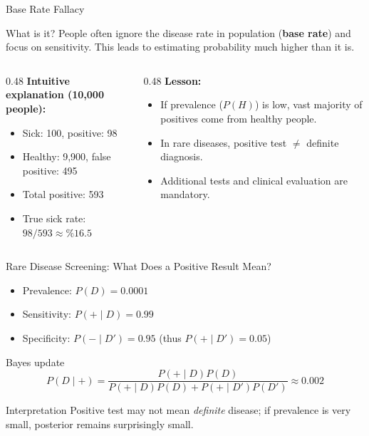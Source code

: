 \documentclass[light]{lutbeamer}
\begin{document}
\begin{frame}{Base Rate Fallacy}
    \begin{block}{What is it?}
        People often ignore the disease rate in population (\textbf{base rate}) and focus on sensitivity. This leads to estimating probability much higher than it is.
    \end{block}

    \begin{columns}[T]
        \begin{column}{0.48\textwidth}
            \textbf{Intuitive explanation (10,000 people):}
            \begin{itemize}
                \item Sick: 100, positive: 98
                \item Healthy: 9,900, false positive: 495
                \item Total positive: 593
                \item True sick rate: $98/593 \approx \%16.5$
            \end{itemize}
        \end{column}
        \begin{column}{0.48\textwidth}
            \textbf{Lesson:}
            \begin{itemize}
                \item If prevalence ($P(H)$) is low, vast majority of positives come from healthy people.
                \item In rare diseases, positive test $\neq$ definite diagnosis.
                \item Additional tests and clinical evaluation are mandatory.
            \end{itemize}
        \end{column}
    \end{columns}
\end{frame}

\begin{frame}{Rare Disease Screening: What Does a Positive Result Mean?}
    \small
    \begin{itemize}
        \item Prevalence: $P(D)=0.0001$
        \item Sensitivity: $P(+\mid D)=0.99$
        \item Specificity: $P(-\mid D')=0.95$ \;\; (thus $P(+\mid D')=0.05$)
    \end{itemize}

    \begin{alertblock}{Bayes update}
        \[
        P(D\mid +)=\frac{P(+\mid D)P(D)}{P(+\mid D)P(D)+P(+\mid D')P(D')}
        \approx 0.002
        \]
    \end{alertblock}

    \begin{block}{Interpretation}
        Positive test may not mean \emph{definite} disease; if prevalence is very small, posterior remains surprisingly small.
    \end{block}
\end{frame}
\end{document}
